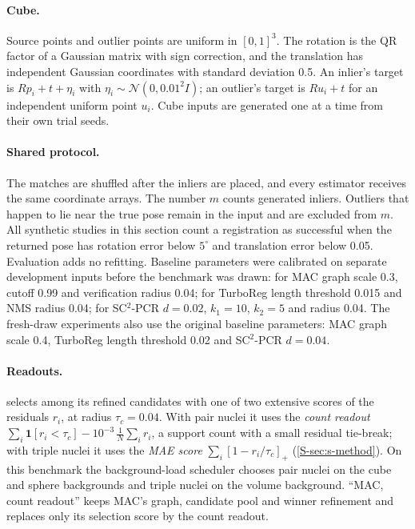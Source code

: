 \paragraph{Cube.} Source points and outlier points are uniform in $[0,1]^3$. The rotation is the QR factor of a Gaussian matrix with sign correction, and the translation has independent Gaussian coordinates with standard deviation 0.5. An inlier's target is $Rp_i+t+\eta_i$ with $\eta_i\sim\mathcal{N}(0,0.01^2I)$; an outlier's target is $Ru_i+t$ for an independent uniform point $u_i$. Cube inputs are generated one at a time from their own trial seeds.

\paragraph{Shared protocol.} The matches are shuffled after the inliers are placed, and every estimator receives the same coordinate arrays. The number $m$ counts generated inliers. Outliers that happen to lie near the true pose remain in the input and are excluded from $m$. All synthetic studies in this section count a registration as successful when the returned pose has rotation error below $5^\circ$ and translation error below 0.05. Evaluation adds no refitting. Baseline parameters were calibrated on separate development inputs before the benchmark was drawn: for MAC graph scale 0.3, cutoff 0.99 and verification radius 0.04; for TurboReg length threshold 0.015 and NMS radius 0.04; for SC$^2$-PCR $d=0.02$, $k_1=10$, $k_2=5$ and radius 0.04. The fresh-draw experiments also use the original baseline parameters: MAC graph scale 0.4, TurboReg length threshold 0.02 and SC$^2$-PCR $d=0.04$.

\paragraph{Readouts.} \ngr{} selects among its refined candidates with one of two extensive scores of the residuals $r_i$, at radius $\tau_c=0.04$. With pair nuclei it uses the \emph{count readout} $\sum_i\mathbf{1}[r_i<\tau_c]-10^{-3}\,\frac1N\sum_i r_i$, a support count with a small residual tie-break; with triple nuclei it uses the \emph{MAE score} $\sum_i[1-r_i/\tau_c]_+$ (\cref{S-sec:s-method}). On this benchmark the background-load scheduler chooses pair nuclei on the cube and sphere backgrounds and triple nuclei on the volume background. ``MAC, count readout'' keeps MAC's graph, candidate pool and winner refinement and replaces only its selection score by the count readout.

